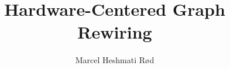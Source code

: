 \documentclass[../main.tex]{subfiles}
\begin{document}
\title{Hardware-Centered Graph Rewiring}
\author{Marcel Heshmati R\o d}

{}

\renewcommand{\submittedtext}{A dissertation submitted in partial completion of the}

    \maketitle
\end{document}
